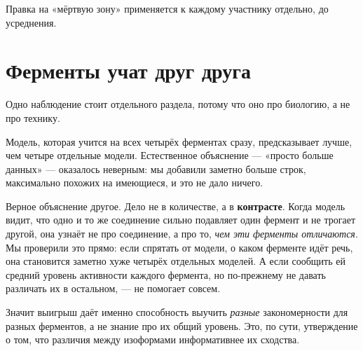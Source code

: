 \documentclass[11pt,a4paper]{article}
\begin{document}
Правка на «мёртвую зону» применяется к каждому участнику отдельно, до усреднения.

\section{Ферменты учат друг друга}

Одно наблюдение стоит отдельного раздела, потому что оно про биологию, а не про технику.

Модель, которая учится на всех четырёх ферментах сразу, предсказывает лучше, чем четыре
отдельные модели. Естественное объяснение --- «просто больше данных» --- оказалось неверным:
мы добавили заметно больше строк, максимально похожих на имеющиеся, и это не дало ничего.

Верное объяснение другое. Дело не в количестве, а в \textbf{контрасте}. Когда модель видит,
что одно и то же соединение сильно подавляет один фермент и не трогает другой, она узнаёт не
про соединение, а про то, \emph{чем эти ферменты отличаются}. Мы проверили это прямо: если
спрятать от модели, о каком ферменте идёт речь, она становится заметно хуже четырёх отдельных
моделей. А если сообщить ей средний уровень активности каждого фермента, но по-прежнему не
давать различать их в остальном, --- не помогает совсем.

Значит выигрыш даёт именно способность выучить \emph{разные} закономерности для разных
ферментов, а не знание про их общий уровень. Это, по сути, утверждение о том, что различия
между изоформами информативнее их сходства.

\begin{center}\end{center}
\end{document}
